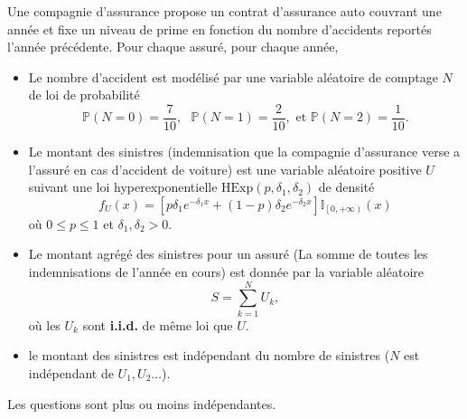 \documentclass[11pt, addpoints, answers]{exam}
\begin{document}
\begin{questions}
\question Une compagnie d'assurance propose un contrat d'assurance auto couvrant une année et fixe un niveau de prime en fonction du nombre d'accidents reportés l'année précédente. Pour chaque assuré, pour chaque année,
\begin{itemize}
\item Le nombre d'accident est modélisé par une variable aléatoire de comptage $N$ de loi de probabilité
\begin{equation*}
\mathbb{P}(N=0)=\frac{7}{10},\text{ }\mathbb{P}(N=1)=\frac{2}{10},\text{ et }\mathbb{P}(N=2)=\frac{1}{10}.
\end{equation*}
\item Le montant des sinistres (indemnisation que la compagnie d'assurance verse a l'assuré en cas d'accident de voiture) est une variable aléatoire positive $U$ suivant une loi hyperexponentielle $\text{HExp}(p,\delta_1,\delta_2)$ de densité
\begin{equation*}
f_U(x)=\left[p\delta_1e^{-\delta_{1}x}+(1-p)\delta_{2}e^{-\delta_{2}x}\right]\mathbb{I}_{\left[0,+\infty\right)}(x)
\end{equation*}
où $0\leq p\leq1$ et $\delta_1,\delta_2>0$.
\item Le montant agrégé des sinistres pour un assuré (La somme de toutes les indemnisations de l'année en cours) est donnée par la variable aléatoire
$$S=\sum_{k=1}^{N}U_{k},$$
où les $U_k$ sont \textbf{i.i.d.} de même loi que $U$.
\item le montant des sinistres est indépendant du nombre de sinistres ($N$ est indépendant de $U_1,U_2\ldots$). 
\end{itemize}
Les questions sont plus ou moins indépendantes.
\end{questions}
\end{document}
